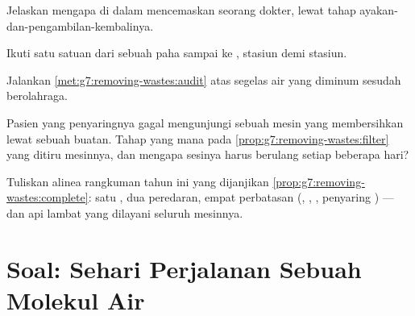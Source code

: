 \begin{exercise}[$\star\star$]\label{exo:g7:removing-wastes:8}
Jelaskan mengapa  di dalam  mencemaskan seorang dokter,
lewat tahap ayakan-dan-pengambilan-kembalinya.
\end{exercise}

\begin{exercise}[$\star\star$]\label{exo:g7:removing-wastes:9}
Ikuti satu satuan  dari  sebuah  paha sampai ke , stasiun demi stasiun.
\end{exercise}

\begin{exercise}[$\star\star$]\label{exo:g7:removing-wastes:10}
Jalankan \cref{met:g7:removing-wastes:audit} atas segelas air yang
diminum sesudah berolahraga.
\end{exercise}

\begin{exercise}[$\star\star$]\label{exo:g7:removing-wastes:11}
Pasien  yang penyaringnya gagal mengunjungi sebuah mesin yang
membersihkan  lewat sebuah  buatan. Tahap yang mana
pada \cref{prop:g7:removing-wastes:filter} yang ditiru mesinnya, dan
mengapa sesinya harus berulang setiap beberapa hari?
\end{exercise}

\begin{exercise}[$\star\star\star$]\label{exo:g7:removing-wastes:12}
Tuliskan alinea rangkuman tahun ini yang dijanjikan
\cref{prop:g7:removing-wastes:complete}: satu , dua peredaran,
empat perbatasan (, ,  , penyaring
) --- dan api lambat yang dilayani seluruh mesinnya.
\end{exercise}

\section{Soal: Sehari Perjalanan Sebuah Molekul Air}

